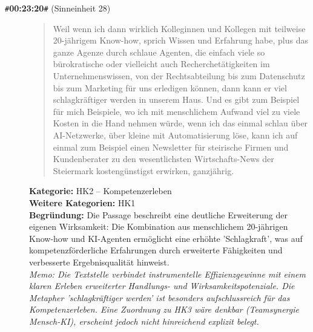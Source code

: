 \begin{description}
  \item[\texttt{\#}\textbf{00:23:20}\texttt{\#} (Sinneinheit 28)]
  \begin{quote}
  Weil wenn ich dann wirklich Kolleginnen und Kollegen mit teilweise 20-jährigem Know-how, sprich Wissen und Erfahrung habe, plus das ganze Agenze durch schlaue Agenten, die einfach viele so bürokratische oder vielleicht auch Recherchetätigkeiten im Unternehmenswissen, von der Rechtsabteilung bis zum Datenschutz bis zum Marketing für uns erledigen können, dann kann er viel schlagkräftiger werden in unserem Haus. Und es gibt zum Beispiel für mich Beispiele, wo ich mit menschlichem Aufwand viel zu viele Kosten in die Hand nehmen würde, wenn ich das einmal schlau über AI-Netzwerke, über kleine mit Automatisierung löse, kann ich auf einmal zum Beispiel einen Newsletter für steirische Firmen und Kundenberater zu den wesentlichsten Wirtschafts-News der Steiermark kostengünstigst erwirken, ganzjährig.
  \end{quote}
  \textbf{Kategorie:} HK2 -- Kompetenzerleben\\
  \textbf{Weitere Kategorien:} HK1\\
  \textbf{Begr\"undung:} Die Passage beschreibt eine deutliche Erweiterung der eigenen Wirksamkeit: Die Kombination aus menschlichem 20-jährigen Know-how und KI-Agenten ermöglicht eine erhöhte 'Schlagkraft', was auf kompetenzförderliche Erfahrungen durch erweiterte Fähigkeiten und verbesserte Ergebnisqualität hinweist.
  \\\textit{Memo: Die Textstelle verbindet instrumentelle Effizienzgewinne mit einem klaren Erleben erweiterter Handlungs- und Wirksamkeitspotenziale. Die Metapher 'schlagkräftiger werden' ist besonders aufschlussreich für das Kompetenzerleben. Eine Zuordnung zu HK3 wäre denkbar (Teamsynergie Mensch-KI), erscheint jedoch nicht hinreichend explizit belegt.}
\end{description}
\medskip

